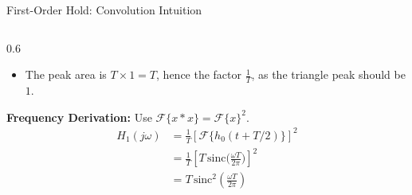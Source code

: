 \begin{frame}{First-Order Hold: Convolution Intuition}
\begin{columns}
\begin{column}{0.6\textwidth}
\begin{itemize}
        \item The peak area is $T \times 1 = T$, hence the factor $\frac{1}{T}$, as the triangle peak should be $1$.
      \end{itemize}
      \vspace{0.4cm}
      \textbf{Frequency Derivation:} Use $\mathcal{F}\{ x * x \} = \mathcal{F}\{x\}^2$.
      \vspace{-0.2cm}
      \begin{align*}
        H_1(j\omega) & = \frac{1}{T} \left[ \mathcal{F}\Big\{ h_0(t+T/2) \Big\} \right]^2             \\
        & = \frac{1}{T} \left[ T \, \text{sinc}\Big(\frac{\omega T}{2\pi}\Big) \right]^2 \\
        & = T \, \text{sinc}^2\left(\frac{\omega T}{2\pi}\right)
      \end{align*}
    \end{column}
  \end{columns}
\end{frame}

